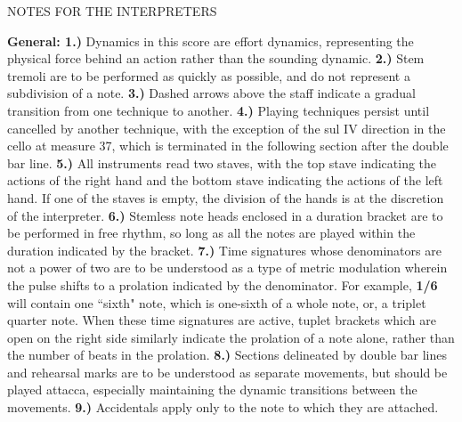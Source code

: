 \documentclass[12pt]{article}
\begin{document}
\begingroup
\begin{center}
\huge NOTES FOR THE INTERPRETERS
\end{center}
\endgroup

\begingroup
\begin{center}
\huge 
\end{center}
\endgroup


\begingroup
\textbf{General: 1.)} Dynamics in this score are effort dynamics, representing the physical force behind an action rather than the sounding dynamic. \textbf{2.)} Stem tremoli are to be performed as quickly as possible, and do not represent a subdivision of a note. \textbf{3.)} Dashed arrows above the staff indicate a gradual transition from one technique to another. \textbf{4.)}  Playing techniques persist until cancelled by another technique, with the exception of the sul IV direction in the cello at measure 37, which is terminated in the following section after the double bar line. \textbf{5.)}  All instruments read two staves, with the top stave indicating the actions of the right hand and the bottom stave indicating the actions of the left hand. If one of the staves is empty, the division of the hands is at the discretion of the interpreter. \textbf{6.)} Stemless note heads enclosed in a duration bracket are to be performed in free rhythm, so long as all the notes are played within the duration indicated by the bracket. \textbf{7.)} Time signatures whose denominators are not a power of two are to be understood as a type of metric modulation wherein the pulse shifts to a prolation indicated by the denominator. For example, \textbf{1/6} will contain one ``sixth" note, which is one-sixth of a whole note, or, a triplet quarter note. When these time signatures are active, tuplet brackets which are open on the right side similarly indicate the prolation of a note alone, rather than the number of beats in the prolation. \textbf{8.)} Sections delineated by double bar lines and rehearsal marks are to be understood as separate movements, but should be played attacca, especially maintaining the dynamic transitions between the movements. \textbf{9.)} Accidentals apply only to the note to which they are attached. \\\
\endgroup
\end{document}
